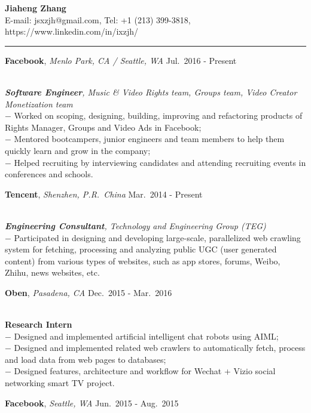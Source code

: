 \documentclass[a4paper,10pt]{article}
\newcommand{\shadedsection}[1]{
    \setlength{\fboxsep}{0pt}
    \colorbox{shadecolor}{%
        \begin{minipage}{\linewidth}%
            \vspace{0.2em}%
            #1%
        \end{minipage}%
    }
}
\newenvironment{rSection}[1]{ %
  \medskip
  \hspace{-1.5em}{\color{Blue}\MakeUppercase{\large \bf {#1}}} %
  \vspace{-0.2em}
  \medskip
  \hrule %
  \begin{list}{}{ %
    \setlength{\leftmargin}{1.5em} %
  }
\setlength{\itemsep}{1pt}
  \item[]
}{
  \end{list}
}
\newcommand{\detail}[1]{{$-$ {#1}}}
\newcommand{\period}[3]{\normalsize {#1} \hfill {#2} - {#3}}
\begin{document}
\begin{center}
  {\huge \bf \color{Blue} Jiaheng Zhang}\\
  \medskip
  {E-mail: jsxzjh@gmail.com, Tel: +1 (213) 399-3818, https://www.linkedin.com/in/ixzjh/}
\end{center}

\begin{rSection}{Experience}
  \vspace{-1.5em}
  \item
    \shadedsection{\period{{\bf Facebook}, {\em Menlo Park, CA / Seattle, WA}}{Jul.~2016}{Present}}\\
    {\em {\bf Software Engineer}, Music \& Video Rights team, Groups team, Video Creator Monetization team}\\
    \detail{Worked on scoping, designing, building, improving and refactoring products of Rights Manager, Groups and Video Ads in Facebook;}\\
    \detail{Mentored bootcampers, junior engineers and team members to help them quickly learn and grow in the company;}\\
    \detail{Helped recruiting by interviewing candidates and attending recruiting events in conferences and schools.}
  \item
    \shadedsection{\period{{\bf Tencent}, {\em Shenzhen, P.R.~China}}{Mar.~2014}{Present}}\\
    {\em {\bf Engineering Consultant}, Technology and Engineering Group (TEG)}\\
    \detail{Participated in designing and developing large-scale, parallelized web crawling system for fetching, processing and analyzing public UGC (user generated content) from various types of websites, such as app stores, forums, Weibo, Zhihu, news websites, etc.}
  \item
    \shadedsection{\period{{\bf Oben}, {\em Pasadena, CA}}{Dec.~2015}{Mar.~2016}}\\
    {\bf Research Intern}\\
    \detail{Designed and implemented artificial intelligent chat robots using AIML;}\\
    \detail{Designed and implemented related web crawlers to automatically fetch, process and load data from web pages to databases;}\\
    \detail{Designed features, architecture and workflow for Wechat + Vizio social networking smart TV project.}
  \item
    \shadedsection{\period{{\bf Facebook}, {\em Seattle, WA}}{Jun.~2015}{Aug.~2015}}\\

\end{rSection}
\end{document}
